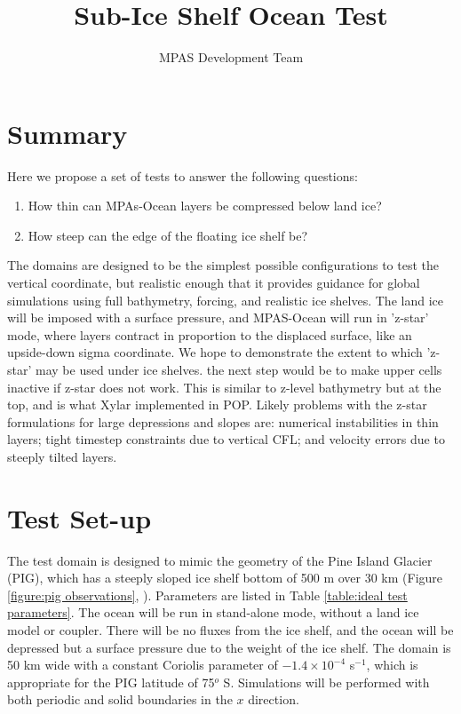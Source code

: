 \documentclass[11pt]{report}
\begin{document}
\title{
Sub-Ice Shelf Ocean Test
}
\author{MPAS Development Team}

\maketitle
\tableofcontents


\chapter{Summary}

Here we propose a set of tests to answer the following questions:
\begin{enumerate}
\item How thin can MPAs-Ocean layers be compressed below land ice?
\item How steep can the edge of the floating ice shelf be?
\end{enumerate}
The domains are designed to be the simplest possible configurations to test the vertical coordinate, but realistic enough that it provides guidance for global simulations using full bathymetry, forcing, and realistic ice shelves.    The land ice will be imposed with a surface pressure, and MPAS-Ocean will run in 'z-star' mode, where layers contract in proportion to the displaced surface, like an upside-down sigma coordinate.  We hope to demonstrate the extent to which 'z-star' may be used under ice shelves.  the next step would be to make upper cells inactive if z-star does not work.  This is similar to z-level bathymetry but at the top, and is what Xylar implemented in POP.  Likely problems with the z-star formulations for large depressions and slopes are: numerical instabilities in thin layers; tight timestep constraints due to vertical CFL; and velocity errors due to steeply tilted layers.


\chapter{Test Set-up}

The test domain is designed to mimic the geometry of the Pine Island Glacier (PIG), which has a steeply sloped ice shelf bottom of 500 m over 30 km (Figure \ref{figure:pig observations}, \citet{Jenkins_ea10ngeo}).  Parameters are listed in Table \ref{table:ideal test parameters}.  The ocean will be run in stand-alone mode, without a land ice model or coupler.  There will be no fluxes from the ice shelf, and the ocean will be depressed but a surface pressure due to the weight of the ice shelf.  The domain is 50 km wide with a constant Coriolis parameter of $-1.4\times10^{-4}$ s$^{-1}$, which is appropriate for the PIG latitude of 75$^o$ S.  Simulations will be performed with both periodic and solid  boundaries in the $x$ direction.
\end{document}
